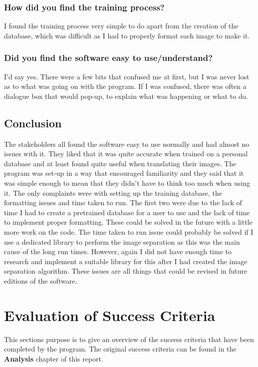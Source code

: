 \documentclass{report}
\begin{document}
\subsubsection{How did you find the training process?}
I found the training process very simple to do apart from the creation of the database, which was difficult as I had to properly format each image to make it.
\subsubsection{Did you find the software easy to use/understand?}
I'd say yes. There were a few bits that confused me at first, but I was never lost as to what was going on with the program. If I was confused, there was often a dialogue box that would pop-up, to explain what was happening or what to do.
\subsection{Conclusion}
The stakeholders all found the software easy to use normally and had almost no issues with it. They liked that it was quite accurate when trained on a personal database and at least found quite useful when translating their images. The program was set-up in a way that encouraged familiarity and they said that it was simple enough to mean that they didn't have to think too much when using it.
\newline
The only complaints were with setting up the training database, the formatting issues and time taken to run. The first two were due to the lack of time I had to create a pretrained database for a user to use and the lack of time to implement proper formatting. These could be solved in the future with a little more work on the code. The time taken to run issue could probably be solved if I use a dedicated library to perform the image separation as this was the main cause of the long run times. However, again I did not have enough time to research and implement a suitable library for this after I had created the image separation algorithm. These issues are all things that could be revised in future editions of the software. 
\newpage
\section{Evaluation of Success Criteria}
This sections purpose is to give an overview of the success criteria that have been completed by the program. The original success criteria can be found in the \textbf{Analysis} chapter of this report. 
\end{document}
